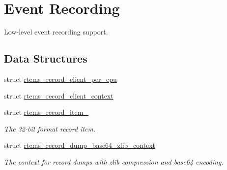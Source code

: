 \hypertarget{group__RTEMSRecord}{}\section{Event Recording}
\label{group__RTEMSRecord}


Low-\/level event recording support.  


\subsection*{Data Structures}
\begin{DoxyCompactItemize}
\item 
struct \mbox{\hyperlink{structrtems__record__client__per__cpu}{rtems\+\_\+record\+\_\+client\+\_\+per\+\_\+cpu}}
\item 
struct \mbox{\hyperlink{structrtems__record__client__context}{rtems\+\_\+record\+\_\+client\+\_\+context}}
\item 
struct \mbox{\hyperlink{structrtems__record__item__32}{rtems\+\_\+record\+\_\+item\+\_}}
\begin{DoxyCompactList}\small\item\em The 32-\/bit format record item. \end{DoxyCompactList}\item 
struct \mbox{\hyperlink{structrtems__record__dump__base64__zlib__context}{rtems\+\_\+record\+\_\+dump\+\_\+base64\+\_\+zlib\+\_\+context}}
\begin{DoxyCompactList}\small\item\em The context for record dumps with zlib compression and base64 encoding. \end{DoxyCompactList}\end{DoxyCompactItemize}
